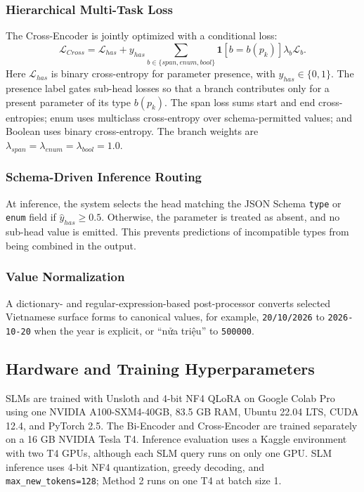 \documentclass[10pt,twocolumn,a4paper]{article}
\begin{document}
\subsubsection{Hierarchical Multi-Task Loss}
The Cross-Encoder is jointly optimized with a conditional loss:
\[
\mathcal{L}_{Cross}=\mathcal{L}_{has}+y_{has}\sum_{b\in\{span,enum,bool\}}\mathbf{1}[b=b(p_k)]\lambda_b\mathcal{L}_b.
\]
Here $\mathcal{L}_{has}$ is binary cross-entropy for parameter presence, with $y_{has}\in\{0,1\}$. The presence label gates sub-head losses so that a branch contributes only for a present parameter of its type $b(p_k)$. The span loss sums start and end cross-entropies; enum uses multiclass cross-entropy over schema-permitted values; and Boolean uses binary cross-entropy. The branch weights are $\lambda_{span}=\lambda_{enum}=\lambda_{bool}=1.0$.

\subsubsection{Schema-Driven Inference Routing}
At inference, the system selects the head matching the JSON Schema \texttt{type} or \texttt{enum} field if $\hat{y}_{has}\geq 0.5$. Otherwise, the parameter is treated as absent, and no sub-head value is emitted. This prevents predictions of incompatible types from being combined in the output.

\subsubsection{Value Normalization}
A dictionary- and regular-expression-based post-processor converts selected Vietnamese surface forms to canonical values, for example, \texttt{20/10/2026} to \texttt{2026-10-20} when the year is explicit, or ``nửa triệu'' to \texttt{500000}.

\subsection{Hardware and Training Hyperparameters}
SLMs are trained with Unsloth and 4-bit NF4 QLoRA \cite{dettmers2023qlora} on Google Colab Pro using one NVIDIA A100-SXM4-40GB, 83.5 GB RAM, Ubuntu 22.04 LTS, CUDA 12.4, and PyTorch 2.5. The Bi-Encoder and Cross-Encoder are trained separately on a 16 GB NVIDIA Tesla T4. Inference evaluation uses a Kaggle environment with two T4 GPUs, although each SLM query runs on only one GPU. SLM inference uses 4-bit NF4 quantization, greedy decoding, and \texttt{max\_new\_tokens=128}; Method 2 runs on one T4 at batch size 1.
\end{document}
